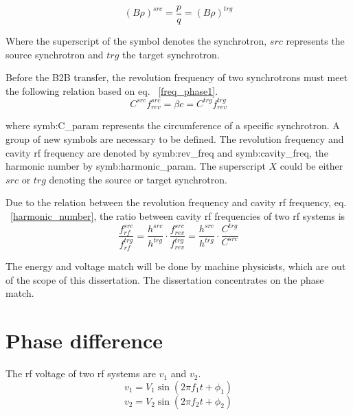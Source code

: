 \begin{equation}
	\label{eq:rigidity}
	(B\rho)^{\mathit{src}} =\frac{p}{q}=(B\rho)^{\mathit{trg}}
\end{equation}

Where the superscript of the symbol denotes the synchrotron, $\mathit{src}$ represents the source synchrotron and $\mathit{trg}$ the target synchrotron. 

Before the B2B transfer, the revolution frequency of two synchrotrons must meet the following relation based on eq. ~\ref{freq_phase1}. 
\begin{equation}
	C^{\mathit{src}}f_{rev}^{\mathit{src}} = \beta c=C^{\mathit{trg}}f_{rev}^{\mathit{trg}}
\end{equation}

where \gls{symb:C_param} represents the circumference of a specific synchrotron. A group of new symbols are necessary to be defined. The revolution frequency and cavity rf frequency are denoted by \gls{symb:rev_freq} and \gls{symb:cavity_freq}, the harmonic number by \gls{symb:harmonic_param}. The superscript $X$ could be either $src$ or $trg$ denoting the source or target synchrotron. 

Due to the relation between the revolution frequency and cavity rf frequency, eq. ~\ref{harmonic_number}, the ratio between cavity rf frequencies of two rf systems is
\begin{equation}
	\frac{f_{rf}^{\mathit{src}}}{f_{rf}^{\mathit{trg}}}=\frac{h^{\mathit{src}}}{h^{\mathit{trg}}}\cdot\frac{f_{rev}^{\mathit{src}}}{f_{rev}^{\mathit{trg}}}=\frac{h^{\mathit{src}}}{h^{\mathit{trg}}}\cdot \frac{C^{\mathit{trg}}}{C^{\mathit{src}}}
\end{equation}

The energy and voltage match will be done by machine physicists, which are out of the scope of this dissertation. The dissertation concentrates on the phase match.
\section{Phase difference}
\label{match}
The rf voltage of two rf systems are $v_1$ and $v_2$.
\begin{equation}
\label{rf_freq1}
	v_1=V_1\sin(2\pi f_1t+\phi_1)
\end{equation}
\begin{equation}
\label{rf_freq2}
	v_2=V_2\sin(2\pi f_2t+\phi_2)
\end{equation}

